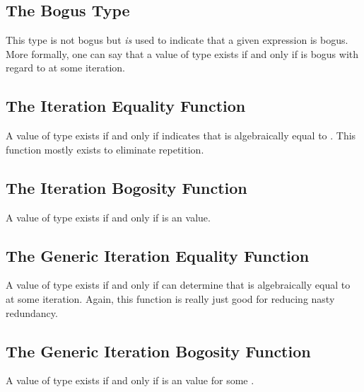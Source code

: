 \documentclass{report}
\begin{document}
\subsection{The Bogus Type}
This type is not bogus but \emph{is} used to indicate that a given expression is bogus.  More formally, one can say that a value of type    exists if and only if  is bogus with regard to   at some iteration.

\subsection{The Iteration Equality Function}
A value of type      exists if and only if      indicates that  is algebraically equal to .  This function mostly exists to eliminate repetition.

\subsection{The Iteration Bogosity Function}
A value of type     exists if and only if     is an  value.

\subsection{The Generic Iteration Equality Function}
A value of type     exists if and only if   can determine that  is algebraically equal to  at some iteration.  Again, this function is really just good for reducing nasty redundancy.

\subsection{The Generic Iteration Bogosity Function}
A value of type    exists if and only if     is an  value for some .
\end{document}
